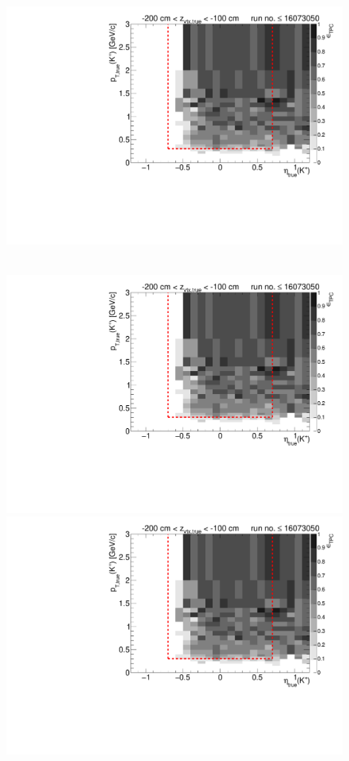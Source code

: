 \begin{figure}[hb]
{  \includegraphics[width=\linewidth,page=17]{graphics/eff/Eff2D_TPC_kaon_Plus_RunRange1.pdf}
}~
\parbox{0.495\textwidth}{
  \centering
  \includegraphics[width=\linewidth,page=12]{graphics/eff/Eff2D_TPC_kaon_Plus_RunRange1.pdf}\\
  \includegraphics[width=\linewidth,page=14]{graphics/eff/Eff2D_TPC_kaon_Plus_RunRange1.pdf}\\
}
\end{figure}
